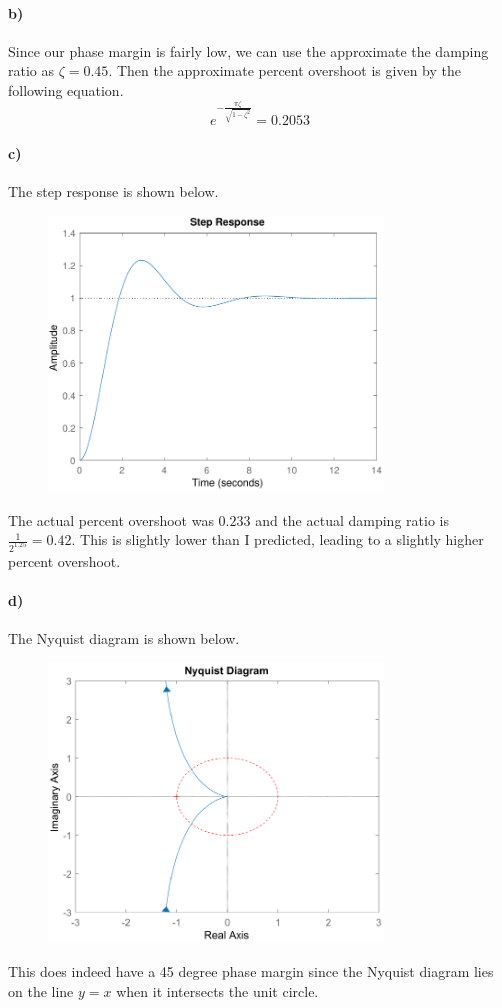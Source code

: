 \documentclass[12pt]{article}
\begin{document}
\paragraph{b)}

Since our phase margin is fairly low, we can use the approximate the damping ratio as \(\zeta=0.45\).
Then the approximate percent overshoot is given by the following equation.
\[e^{-\frac{\pi\zeta}{\sqrt{1-\zeta^2}}}=0.2053\]

\paragraph{c)}

The step response is shown below.
\begin{figure}[H]
    \begin{center}
        \includegraphics[width=3.5in]{problem4c.pdf}
    \end{center}
\end{figure}
The actual percent overshoot was \(0.233\) and the actual damping ratio is
\(\frac{1}{2^{1.25}}=0.42\). This is slightly lower than I predicted, leading to a slightly higher
percent overshoot.

\paragraph{d)}

The Nyquist diagram is shown below.
\begin{figure}[H]
    \begin{center}
        \includegraphics[width=3.5in]{problem4d.pdf}
    \end{center}
\end{figure}
This does indeed have a 45 degree phase margin since the Nyquist diagram lies on the line \(y=x\)
when it intersects the unit circle.
\end{document}
